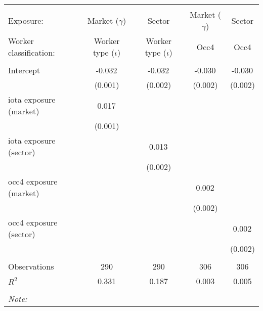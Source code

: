 \begin{tabular}{@{\extracolsep{5pt}}lcccc}
\\[-1.8ex]\hline
\hline \\[-1.8ex]
\hline \\[-1.8ex]
 Exposure: & Market ($\gamma$) & Sector & Market ($\gamma$) & Sector \\
 Worker classification: & Worker type ($\iota$) & Worker type ($\iota$) & Occ4 & Occ4 \\
 \hline &  &  &  &  \\
 Intercept & -0.032$^{}$ & -0.032$^{}$ & -0.030$^{}$ & -0.030$^{}$ \\
  & (0.001) & (0.002) & (0.002) & (0.002) \\
 iota exposure (market) & 0.017$^{}$ & & & \\
  & (0.001) & & & \\
 iota exposure (sector) & & 0.013$^{}$ & & \\
  & & (0.002) & & \\
 occ4 exposure (market) & & & 0.002$^{}$ & \\
  & & & (0.002) & \\
 occ4 exposure (sector) & & & & 0.002$^{}$ \\
  & & & & (0.002) \\
\hline \\[-1.8ex]
 Observations & 290 & 290 & 306 & 306 \\
 $R^2$ & 0.331 & 0.187 & 0.003 & 0.005 \\
\hline
\hline \\[-1.8ex]
\textit{Note:}\end{tabular}